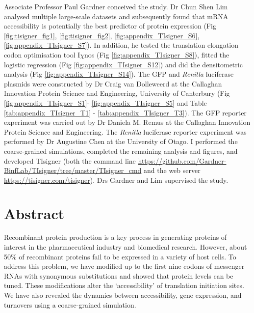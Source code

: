 Associate Professor Paul Gardner conceived the study. Dr Chun Shen Lim analysed multiple large-scale datasets and subsequently found that mRNA accessibility is potentially the best predictor of protein expression (Fig \ref{fig:tisigner_fig1}, \ref{fig:tisigner_fig2}, \ref{fig:appendix_TIsigner_S6}, \ref{fig:appendix_TIsigner_S7}). In addition, he tested the translation elongation codon optimisation tool I$\chi$nos (Fig \ref{fig:appendix_TIsigner_S8}), fitted the logistic regression  (Fig \ref{fig:appendix_TIsigner_S12}) and did the densitometric analysis (Fig \ref{fig:appendix_TIsigner_S14}). The GFP and \textit{Renilla} luciferase plasmids were constructed by Dr Craig van Dolleweerd at the Callaghan Innovation Protein Science and Engineering, University of Canterbury (Fig \ref{fig:appendix_TIsigner_S1}- \ref{fig:appendix_TIsigner_S5} and Table \ref{tab:appendix_TIsigner_T1} - \ref{tab:appendix_TIsigner_T3}). The GFP reporter experiment was carried out by Dr Daniela M. Remus at the Callaghan Innovation Protein Science and Engineering. The \textit{Renilla} luciferase reporter experiment was performed by Dr Augustine Chen at the University of Otago. I performed the coarse-grained simulations, completed the remaining analysis and figures, and developed TIsigner (both the command line \href{https://github.com/Gardner-BinfLab/TIsigner/tree/master/TIsigner\_cmd}{https://github.com/Gardner-BinfLab/TIsigner/tree/master/TIsigner\_cmd} and the web server \href{https://tisigner.com/tisigner}{https://tisigner.com/tisigner}). Drs Gardner and Lim supervised the study.

\section{Abstract}
Recombinant protein production is a key process in generating proteins of interest in the pharmaceutical industry and biomedical research. However, about 50\% of recombinant proteins fail to be expressed in a variety of host cells. To address this problem, we have modified up to the first nine codons of messenger RNAs with synonymous substitutions and showed that protein levels can be tuned. These modifications alter the ‘accessibility’ of translation initiation sites. We have also revealed the dynamics between accessibility, gene expression, and turnovers using a coarse-grained simulation.

